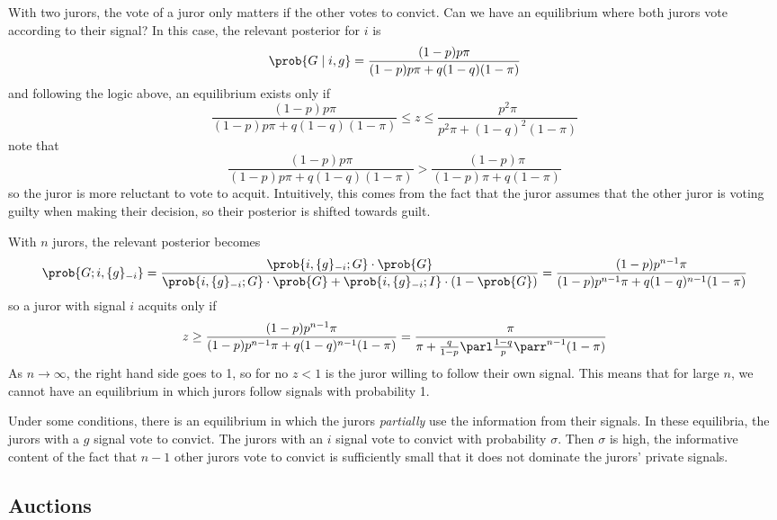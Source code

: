\documentclass[10pt]{article}
\begin{document}
\begin{example}
	With two jurors, the vote of a juror only matters if the other votes to convict. Can we have an equilibrium where both jurors vote according to their signal? In this case, the relevant posterior for $i$ is \[\prob\{G \mid i,g\} = \frac{(1-p)p\pi}{(1-p)p\pi + q(1-q)(1-\pi)}\]and following the logic above, an equilibrium exists only if \[\frac{(1-p)p\pi}{(1-p)p\pi + q(1-q)(1-\pi)} \le z \le \frac{p^2 \pi}{p^2\pi + (1-q)^2(1-\pi)}\] note that \[\frac{(1-p)p\pi }{(1-p)p\pi + q(1-q)(1-\pi)} > \frac{(1-p)\pi}{(1-p)\pi + q(1-\pi)}\]so the juror is more reluctant to vote to acquit. Intuitively, this comes from the fact that the juror assumes that the other juror is voting guilty when making their decision, so their posterior is shifted towards guilt.
	
	With $n$ jurors, the relevant posterior becomes \[\prob\{G; i,\{g\}_{-i}\} = \frac{\prob\{i,\{g\}_{-i};G\}\cdot \prob \{G\}}{\prob\{i,\{g\}_{-i};G\}\cdot \prob \{G\} + \prob\{i,\{g\}_{-i};I\}\cdot (1-\prob \{G\})} = \frac{(1-p)p^{n-1}\pi}{(1-p)p^{n-1}\pi + q(1-q)^{n-1}(1-\pi)}\]so a juror with signal $i$ acquits only if \[z \ge \frac{(1-p)p^{n-1}\pi}{(1-p)p^{n-1}\pi + q(1-q)^{n-1}(1-\pi)} = \frac{\pi}{\pi + \frac{q}{1-p} \parl \frac{1-q}{p}\parr^{n-1}(1-\pi)}\]As $n \to \infty$, the right hand side goes to 1, so for no $z < 1$ is the juror willing to follow their own signal. This means that for large $n$, we cannot have an equilibrium in which jurors follow signals with probability 1.
	
	\begin{remark}
		Under some conditions, there is an equilibrium in which the jurors \emph{partially} use the information from their signals. In these equilibria, the jurors with a $g$ signal vote to convict. The jurors with an $i$ signal vote to convict with probability $\sigma$. Then $\sigma$ is high, the informative content of the fact that $n-1$ other jurors vote to convict is sufficiently small that it does not dominate the jurors' private signals.
	\end{remark}
\end{example}





\subsection{Auctions}
\end{document}
